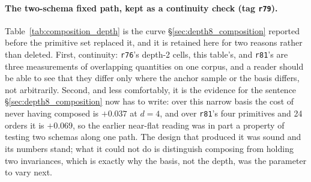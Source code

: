 \paragraph{The two-schema fixed path, kept as a continuity check (tag \texttt{r79}).} Table~\ref{tab:composition_depth} is the curve \S\ref{sec:depth8_composition} reported before the primitive set replaced it, and it is retained here for two reasons rather than deleted. First, continuity: \texttt{r76}'s depth-2 cells, this table's, and \texttt{r81}'s are three measurements of overlapping quantities on one corpus, and a reader should be able to see that they differ only where the anchor sample or the basis differs, not arbitrarily. Second, and less comfortably, it is the evidence for the sentence \S\ref{sec:depth8_composition} now has to write: over this narrow basis the cost of never having composed is $+0.037$ at $d{=}4$, and over \texttt{r81}'s four primitives and 24 orders it is $+0.069$, so the earlier near-flat reading was in part a property of testing two schemas along one path. The design that produced it was sound and its numbers stand; what it could not do is distinguish composing from holding two invariances, which is exactly why the basis, not the depth, was the parameter to vary next.

